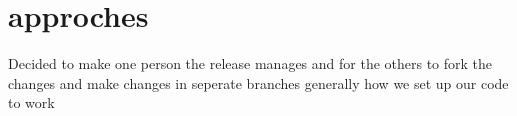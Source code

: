\section{approches}
Decided to make one person the release manages and for the others to fork the changes and make changes in seperate branches
generally how we set up our code to work 



